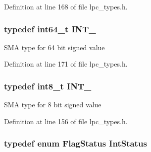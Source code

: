 Definition at line 168 of file lpc\+\_\+types.\+h.

\subsubsection[{\texorpdfstring{I\+N\+T\+\_\+64}{INT_64}}]{\setlength{\rightskip}{0pt plus 5cm}typedef int64\+\_\+t {\bf I\+N\+T\+\_}}\hypertarget{group___l_p_c___types___public___types_ga1a0aab29eee6b306564084e005fa5750}{}\label{group___l_p_c___types___public___types_ga1a0aab29eee6b306564084e005fa5750}
S\+MA type for 64 bit signed value 

Definition at line 171 of file lpc\+\_\+types.\+h.

\subsubsection[{\texorpdfstring{I\+N\+T\+\_\+8}{INT_8}}]{\setlength{\rightskip}{0pt plus 5cm}typedef {\bf int8\+\_\+t} {\bf I\+N\+T\+\_}}\hypertarget{group___l_p_c___types___public___types_gac172005ce53b001f50a677cc10bd17b0}{}\label{group___l_p_c___types___public___types_gac172005ce53b001f50a677cc10bd17b0}
S\+MA type for 8 bit signed value 

Definition at line 156 of file lpc\+\_\+types.\+h.

\subsubsection[{\texorpdfstring{Int\+Status}{IntStatus}}]{\setlength{\rightskip}{0pt plus 5cm}typedef  enum {\bf Flag\+Status}  {\bf Int\+Status}}\hypertarget{group___l_p_c___types___public___types_gab7d263072f745b4f3913fb0afc434c4e}{}\label{group___l_p_c___types___public___types_gab7d263072f745b4f3913fb0afc434c4e}
